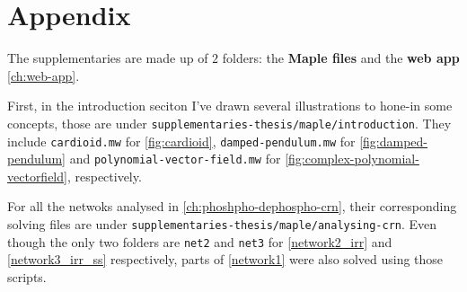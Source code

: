\chapter*{Appendix}\label{appendix}
The supplementaries are made up of $2$ folders: the \textbf{Maple files} and the \textbf{web app} \ref{ch:web-app}.

First, in the introduction seciton I've drawn several illustrations to hone-in some concepts, those are under \verb|supplementaries-thesis/maple/introduction|. They include \verb|cardioid.mw| for \ref{fig:cardioid}, \verb|damped-pendulum.mw| for \ref{fig:damped-pendulum} and \verb|polynomial-vector-field.mw| for \ref{fig:complex-polynomial-vectorfield}, respectively.

For all the netwoks analysed in \ref{ch:phoshpho-dephospho-crn}, their corresponding solving files are under \verb|supplementaries-thesis/maple/analysing-crn|. Even though the only two folders are \verb|net2| and \verb|net3| for \ref{network2_irr} and \ref{network3_irr_ss} respectively, parts of \ref{network1} were also solved using those scripts.